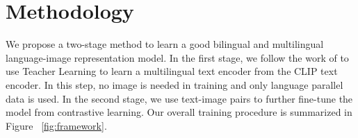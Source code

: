 \section{Methodology} 
We propose a two-stage method to learn a good bilingual and multilingual language-image representation model. In the first stage, we follow the work of  to use Teacher Learning to learn a multilingual text encoder from the CLIP text encoder. In this step, no image is needed in training and only language parallel data is used. In the second stage, we use text-image pairs to further fine-tune the model from contrastive learning.  Our overall training procedure is summarized in Figure ~\ref{fig:framework}.


